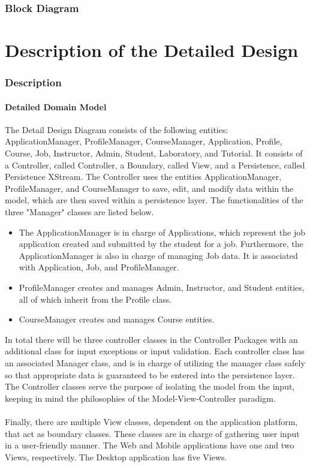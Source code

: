 \documentclass[12pt]{report}
\begin{document}
\section{Block Diagram}


\part{Description of the Detailed Design}
\section{Description}
\subsection{Detailed Domain Model}
The Detail Design Diagram consists of the following entities: ApplicationManager, ProfileManager,
CourseManager, Application, Profile, Course, Job, Instructor, Admin, Student, Laboratory, and
Tutorial. It consists of a Controller, called Controller, a Boundary, called View, and a
Persistence, called Persistence XStream. The Controller uses the entities ApplicationManager,
ProfileManager, and CourseManager to save, edit, and modify data within the model, which are then
saved within a persistence layer. The functionalities of the three "Manager" classes are listed
below.
\begin{itemize}
	\item The ApplicationManager is in charge of Applications, which represent the job application
		created and submitted
		by the student for a job. Furthermore, the ApplicationManager is also in charge of managing
		Job data. It is associated with Application, Job, and ProfileManager.
	\item ProfileManager creates and manages Admin, Instructor, and Student entities, all of which inherit from
		the Profile class.
	\item CourseManager creates and manages Course entities.
\end{itemize}
In total there will be three controller classes in the Controller Packages with an additional class
for input exceptions or input validation. Each controller class has an associated Manager class, and
is in charge of utilizing the manager class safely so that appropriate data is guaranteed to be
entered into the persistence layer.\\
The Controller classes serve the purpose of isolating the model from the input, keeping in mind the
philosophies of the Model-View-Controller paradigm. \\\\
Finally, there are multiple View classes, dependent on the application platform, that act as
boundary classes. These classes are in charge of gathering user input in a user-friendly manner. The
Web and Mobile applications have one and two Views, respectively. The Desktop application has five
Views.
\end{document}
